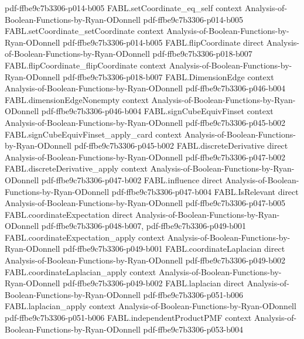 \begin{theorem}
  {pdf-ffbe9c7b3306-p014-b005}
\proofstep
  {FABL.setCoordinate_eq_self}
  {context}
  {Analysis-of-Boolean-Functions-by-Ryan-ODonnell}
  {pdf-ffbe9c7b3306-p014-b005}
\proofstep
  {FABL.setCoordinate_setCoordinate}
  {context}
  {Analysis-of-Boolean-Functions-by-Ryan-ODonnell}
  {pdf-ffbe9c7b3306-p014-b005}
\proofstep
  {FABL.flipCoordinate}
  {direct}
  {Analysis-of-Boolean-Functions-by-Ryan-ODonnell}
  {pdf-ffbe9c7b3306-p018-b007}
\proofstep
  {FABL.flipCoordinate_flipCoordinate}
  {context}
  {Analysis-of-Boolean-Functions-by-Ryan-ODonnell}
  {pdf-ffbe9c7b3306-p018-b007}
\proofstep
  {FABL.DimensionEdge}
  {context}
  {Analysis-of-Boolean-Functions-by-Ryan-ODonnell}
  {pdf-ffbe9c7b3306-p046-b004}
\proofstep
  {FABL.dimensionEdgeNonempty}
  {context}
  {Analysis-of-Boolean-Functions-by-Ryan-ODonnell}
  {pdf-ffbe9c7b3306-p046-b004}
\proofstep
  {FABL.signCubeEquivFinset}
  {context}
  {Analysis-of-Boolean-Functions-by-Ryan-ODonnell}
  {pdf-ffbe9c7b3306-p045-b002}
\proofstep
  {FABL.signCubeEquivFinset_apply_card}
  {context}
  {Analysis-of-Boolean-Functions-by-Ryan-ODonnell}
  {pdf-ffbe9c7b3306-p045-b002}
\proofstep
  {FABL.discreteDerivative}
  {direct}
  {Analysis-of-Boolean-Functions-by-Ryan-ODonnell}
  {pdf-ffbe9c7b3306-p047-b002}
\proofstep
  {FABL.discreteDerivative_apply}
  {context}
  {Analysis-of-Boolean-Functions-by-Ryan-ODonnell}
  {pdf-ffbe9c7b3306-p047-b002}
\proofstep
  {FABL.influence}
  {direct}
  {Analysis-of-Boolean-Functions-by-Ryan-ODonnell}
  {pdf-ffbe9c7b3306-p047-b004}
\proofstep
  {FABL.IsRelevant}
  {direct}
  {Analysis-of-Boolean-Functions-by-Ryan-ODonnell}
  {pdf-ffbe9c7b3306-p047-b005}
\proofstep
  {FABL.coordinateExpectation}
  {direct}
  {Analysis-of-Boolean-Functions-by-Ryan-ODonnell}
  {pdf-ffbe9c7b3306-p048-b007,
    pdf-ffbe9c7b3306-p049-b001}
\proofstep
  {FABL.coordinateExpectation_apply}
  {context}
  {Analysis-of-Boolean-Functions-by-Ryan-ODonnell}
  {pdf-ffbe9c7b3306-p049-b001}
\proofstep
  {FABL.coordinateLaplacian}
  {direct}
  {Analysis-of-Boolean-Functions-by-Ryan-ODonnell}
  {pdf-ffbe9c7b3306-p049-b002}
\proofstep
  {FABL.coordinateLaplacian_apply}
  {context}
  {Analysis-of-Boolean-Functions-by-Ryan-ODonnell}
  {pdf-ffbe9c7b3306-p049-b002}
\proofstep
  {FABL.laplacian}
  {direct}
  {Analysis-of-Boolean-Functions-by-Ryan-ODonnell}
  {pdf-ffbe9c7b3306-p051-b006}
\proofstep
  {FABL.laplacian_apply}
  {context}
  {Analysis-of-Boolean-Functions-by-Ryan-ODonnell}
  {pdf-ffbe9c7b3306-p051-b006}
\proofstep
  {FABL.independentProductPMF}
  {context}
  {Analysis-of-Boolean-Functions-by-Ryan-ODonnell}
  {pdf-ffbe9c7b3306-p053-b004}

\end{theorem}
